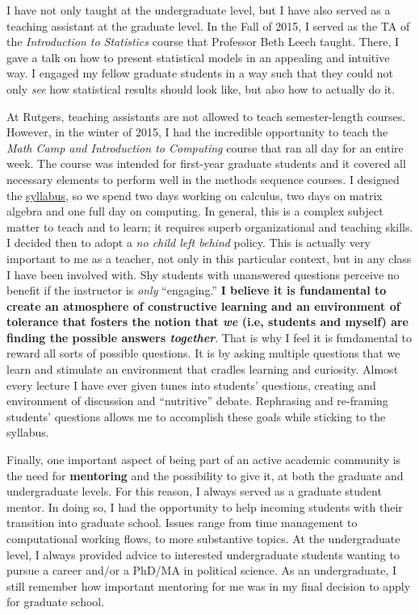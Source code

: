 I have not only taught at the undergraduate level, but I have also served as a teaching assistant at the graduate level. In the Fall of 2015, I served as the TA of the \emph{Introduction to Statistics} course that Professor Beth Leech taught. There, I gave a talk on how to present statistical models in an appealing and intuitive way. I engaged my fellow graduate students in a way such that they could not only \emph{see} how statistical results should look like, but also how to actually do it. 

At Rutgers, teaching assistants are not allowed to teach semester-length courses. However, in the winter of 2015, I had the incredible opportunity to teach the \emph{Math Camp and Introduction to Computing} course that ran all day for an entire week. The course was intended for first-year graduate students and it covered all necessary elements to perform well in the methods sequence courses. I designed the \href{https://github.com/hbahamonde/Math-Camp/raw/master/Syllabus/Math_Camp_Syllabus.pdf}{syllabus}, so we spend two days working on calculus, two days on matrix algebra and one full day on computing. In general, this is a complex subject matter to teach and to learn; it requires superb organizational and teaching skills. I decided then to adopt a \emph{no child left behind} policy. This is actually very important to me as a teacher, not only in this particular context, but in any class I have been involved with. Shy students with unanswered questions perceive no benefit if the instructor is \emph{only} ``engaging.'' {\bf I believe it is fundamental to create an atmosphere of constructive learning and an environment of tolerance that fosters the notion that \emph{we} (i.e, students and myself) are finding the possible answers \emph{together}}. That is why I feel it is fundamental to reward all sorts of possible questions. It is by asking multiple questions that we learn and stimulate an environment that cradles learning and curiosity. Almost every lecture I have ever given tunes into students' questions, creating and environment of discussion and ``nutritive'' debate. Rephrasing and re-framing students' questions allows me to accomplish these goals while sticking to the syllabus. 

Finally, one important aspect of being part of an active academic community is the need for {\bf mentoring} and the possibility to give it, at both the graduate and undergraduate levels. For this reason, I always served as a graduate student mentor. In doing so, I had the opportunity to help incoming students with their transition into graduate school. Issues range from time management to computational working flows, to more substantive topics. At the undergraduate level, I always provided advice to interested undergraduate students wanting to pursue a career and/or a PhD/MA in political science. As an undergraduate, I still remember how important mentoring for me was in my final decision to apply for graduate school.

